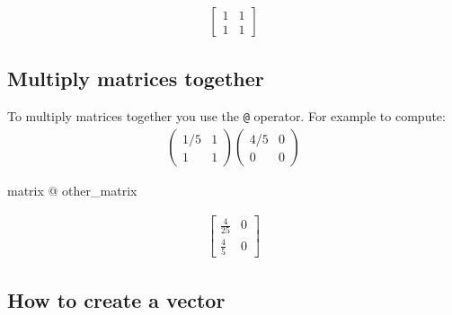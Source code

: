 \begin{equation*}
\begin{split}\displaystyle \left[\begin{matrix}1 & 1\\1 & 1\end{matrix}\right]\end{split}
\end{equation*}




\subsection{Multiply matrices together}
\label{\detokenize{tools-for-mathematics/04-matrices/how/main:multiply-matrices-together}}

To multiply matrices together you use the \texttt{@} operator. For example to compute:
\begin{equation*}
\begin{split}
    \begin{pmatrix}
        1 / 5 & 1\\
        1 & 1
    \end{pmatrix}
    \begin{pmatrix}
        4 / 5 & 0\\
        0 & 0
    \end{pmatrix}
\end{split}
\end{equation*}



\begin{pyin}
matrix @ other_matrix
\end{pyin}




\begin{equation*}
\begin{split}\displaystyle \left[\begin{matrix}\frac{4}{25} & 0\\\frac{4}{5} & 0\end{matrix}\right]\end{split}
\end{equation*}




\subsection{How to create a vector}
\label{\detokenize{tools-for-mathematics/04-matrices/how/main:how-to-create-a-vector}}

